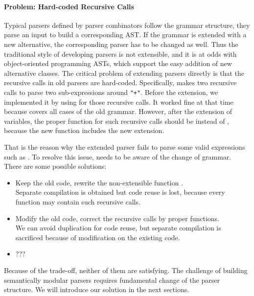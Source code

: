 \paragraph{Problem: Hard-coded Recursive Calls} 
Typical parsers defined by parser combinators follow the grammar
structure, they parse an input to build a corresponding AST. If the grammar is extended
with a new alternative, the corresponding parser has to be changed as
well. Thus the traditional style of developing parsers is not
extensible, and it is at odds with object-oriented programming ASTs,
which support the easy addition of new alternative classes.
The critical problem
of extending parsers directly is that the recursive calls in old
parsers are hard-coded. Specifically,  makes two
recursive calls to parse two sub-expressions around
\lstinline{"+"}. Before the extension, we implemented it by using
 for those recursive calls. It worked fine at that
time because  covers all cases of the old
grammar. However, after the extension of variables, the proper
function for such recursive calls should be 
instead of , because the new function
 includes the new extension.

That is the reason why the extended parser fails to parse some valid
expressions such as . To resolve this issue,
 needs to be aware of the change of grammar. There
are some possible solutions:

\begin{itemize}
    \item Keep the old code, rewrite the non-extensible function . \\Separate compilation is obtained but code reuse is lost, because every function may contain such recursive calls.
    \item Modify the old code, correct the recursive calls by proper functions. \\We can avoid duplication for code reuse, but separate compilation is sacrificed because of modification on the existing code.
    \item ??? 
\end{itemize}

Because of the trade-off, neither of them are satisfying. The challenge of building semantically modular parsers requires fundamental change of the parser structure. We will introduce our solution in the next sections.

